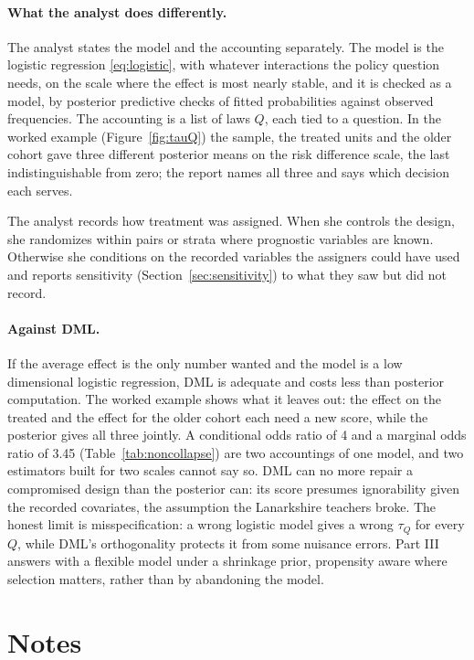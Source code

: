 \paragraph{What the analyst does differently.} The analyst states the model and the accounting separately. The model is the logistic regression \eqref{eq:logistic}, with whatever interactions the policy question needs, on the scale where the effect is most nearly stable, and it is checked as a model, by posterior predictive checks of fitted probabilities against observed frequencies. The accounting is a list of laws $Q$, each tied to a question. In the worked example (Figure~\ref{fig:tauQ}) the sample, the treated units and the older cohort gave three different posterior means on the risk difference scale, the last indistinguishable from zero; the report names all three and says which decision each serves.



The analyst records how treatment was assigned. When she controls the design, she randomizes within pairs or strata where prognostic variables are known. Otherwise she conditions on the recorded variables the assigners could have used and reports sensitivity (Section~\ref{sec:sensitivity}) to what they saw but did not record.

\paragraph{Against DML.} If the average effect is the only number wanted and the model is a low dimensional logistic regression, DML is adequate and costs less than posterior computation. The worked example shows what it leaves out: the effect on the treated and the effect for the older cohort each need a new score, while the posterior gives all three jointly. A conditional odds ratio of 4 and a marginal odds ratio of 3.45 (Table~\ref{tab:noncollapse}) are two accountings of one model, and two estimators built for two scales cannot say so. DML can no more repair a compromised design than the posterior can: its score presumes ignorability given the recorded covariates, the assumption the Lanarkshire teachers broke. The honest limit is misspecification: a wrong logistic model gives a wrong $\tau_Q$ for every $Q$, while DML's orthogonality protects it from some nuisance errors. Part III answers with a flexible model under a shrinkage prior, propensity aware where selection matters, rather than by abandoning the model.

\section*{Notes}

